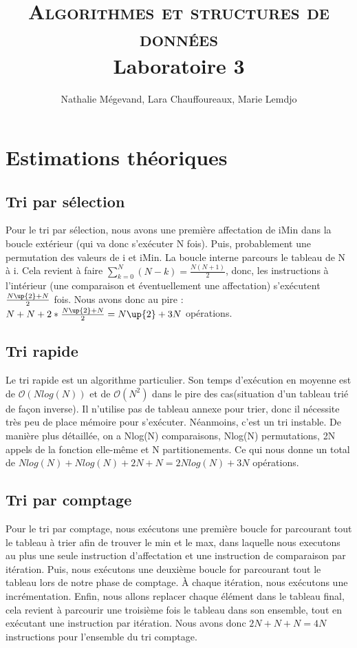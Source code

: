 \documentclass[11pt]{article}
\title{\vspace{-8mm}\textsc{\huge Algorithmes et structures de données}\\ 
 \large{ Laboratoire 3\\}
\vspace{-1 em}
}
\author{Nathalie Mégevand, Lara Chauffoureaux, Marie Lemdjo}
\begin{document}
\maketitle
\thispagestyle{fancy}

\section*{Estimations théoriques}

\subsection*{Tri par sélection}
Pour le tri par sélection, nous avons une première affectation de iMin dans la boucle extérieur (qui va donc s'exécuter N fois). Puis, probablement une permutation des valeurs de i et iMin.
La boucle interne parcours le tableau de N à i. Cela revient à faire $ \sum^{N}_{k = 0}{(N-k)} = \frac{N(N+1)}{2} $, donc, les instructions à l'intérieur (une comparaison et éventuellement une affectation) s'exécutent $ \frac{N\up{2} + N}{2} $ fois. Nous avons donc au pire : $ N + N + 2*\frac{N\up{2} + N}{2} = N\up{2} + 3N $ opérations.

\subsection*{Tri rapide}

Le tri rapide est un algorithme particulier. Son temps d'exécution en moyenne est de $\mathcal{O}(Nlog(N))$ et de $\mathcal{O}(N^2)$ dans le pire des cas(situation d'un tableau trié de façon  inverse). Il n'utilise pas de tableau annexe pour trier, donc il nécessite très peu de place mémoire pour s'exécuter. Néanmoins, c'est un tri instable. De manière plus détaillée, on a Nlog(N) comparaisons, Nlog(N) permutations, 2N appels de la fonction elle-même et N partitionements. Ce qui nous donne un total de $ Nlog(N) + Nlog(N) + 2N + N = 2Nlog(N) + 3N$ opérations.


\subsection*{Tri par comptage}

Pour le tri par comptage, nous exécutons une première boucle for parcourant tout le tableau à trier afin de trouver le min et le max, dans laquelle nous executons au plus une seule instruction d'affectation et une instruction de comparaison par itération. Puis, nous exécutons une deuxième boucle for parcourant tout le tableau lors de notre phase de comptage. À chaque itération, nous exécutons une incrémentation. Enfin, nous allons replacer chaque élément dans le tableau final, cela revient à parcourir une troisième fois le tableau dans son ensemble, tout en exécutant une instruction par itération. Nous avons donc $2N + N + N = 4N$ instructions pour l'ensemble du tri comptage.
\end{document}
